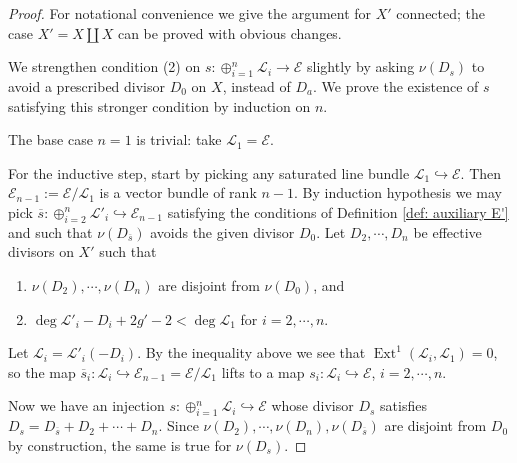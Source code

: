 \documentclass[reqno]{amsart}
\numberwithin{equation}{section}
\newcommand{\Cal}[1]{\mathcal{#1}}
\newcommand{\inj}{\hookrightarrow}
\DeclareMathOperator{\Ext}{Ext}
\newcommand{\incl}{\hookrightarrow}
\newcommand{\ov}{\overline}
\newcommand\op{\oplus}
\newcommand\cE{\mathcal{E}}
\newcommand\cL{\mathcal{L}}
\theoremstyle{remark}
\numberwithin{equation}{section}
\begin{document}
\begin{proof} For notational convenience we give the argument for $X'$ connected; the case $X'=X\coprod X$ can be proved with obvious changes. 

We strengthen condition (2) on $s:\op_{i=1}^{n}\cL_{i}\to \cE$ slightly by asking $\nu(D_{s})$ to avoid a prescribed divisor $D_{0}$ on $X$, instead of $D_{a}$.  We prove the existence of $s$ satisfying this stronger condition by induction on $n$. 

The base case $n=1$ is trivial: take $\cL_{1}=\cE$. %

For the inductive step, start by picking any saturated line bundle $\Cal{L}_{1}\inj \cE$. %
Then $\Cal{E}_{n-1} := \Cal{E}/\Cal{L}_{1}$ is a vector bundle of rank $n-1$. By induction hypothesis  we may pick $\ov s: \op_{i=2}^{n}\cL'_{i} \inj \Cal{E}_{n-1}$ satisfying the conditions of Definition \ref{def: auxiliary E'} and such that $\nu(D_{\ov s})$ avoids the given divisor $D_{0}$. Let $D_{2},\cdots, D_{n}$ be effective divisors on $X'$ such that
\begin{enumerate}
\item $\nu(D_{2}),\cdots, \nu(D_{n})$ are disjoint from $\nu(D_{0})$, and
\item $\deg \cL'_{i}-D_{i}+2g'-2<  \deg \cL_{1}$ for $i=2,\cdots, n$.
\end{enumerate}
Let $\cL_{i}=\cL'_{i}(-D_{i})$. By the inequality above we see that $\Ext^1(\Cal{L}_i, \Cal{L}_1) = 0$, so the map $\ov s_{i}: \cL_{i} \inj \Cal{E}_{n-1}=\cE/\cL_1$ lifts to a map $s_{i}: \cL_{i} \inj \Cal{E}$, $i=2,\cdots, n$. 

Now we have an injection $s: \op_{i=1}^{n}\cL_{i}\inj \cE$ whose divisor $D_{s}$ satisfies $D_{s}=D_{\ov s}+D_{2}+\cdots+D_{n}$. Since $\nu(D_{2}),\cdots, \nu(D_{n}), \nu(D_{\ov s})$ are disjoint from $D_{0}$ by construction, the same is true for $\nu(D_{s})$. 
\end{proof}

\end{document}
